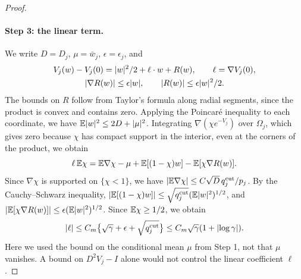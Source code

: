 \begin{proof}
\paragraph{Step 3: the linear term.}
We write $D=D_j$, $\mu=\bar w_j$, $\epsilon=\epsilon_j$, and
\[
 \begin{gathered}
 V_j(w)-V_j(0)=\lvert w\rvert^2/2+\ell\cdot w+R(w),\qquad\ell=\nabla V_j(0),\\
 \lvert \nabla R(w)\rvert\le\epsilon\lvert w\rvert,\qquad\lvert R(w)\rvert\le\epsilon\lvert w\rvert^2/2.
 \end{gathered}
\]
The bounds on $R$ follow from Taylor's formula along radial segments, since the product is convex and contains zero. Applying the Poincar\'e inequality to each coordinate, we have $\mathbb E\lvert w\rvert^2\le2D+\lvert \mu\rvert^2$. Integrating $\nabla(\chi e^{-V_j})$ over $\Omega_j$, which gives zero because $\chi$ has compact support in the interior, even at the corners of the product, we obtain
\begin{equation}\label{ch31:eq:density-interior-score}
 \ell\,\mathbb E\chi=\mathbb E\nabla\chi-\mu+\mathbb E[(1-\chi)w]-\mathbb E[\chi\nabla R(w)].
\end{equation}
Since $\nabla\chi$ is supported on $\{\chi<1\}$, we have $\lvert \mathbb E\nabla\chi\rvert\le C\sqrt D\,q_j^{\rm cut}/p_j$. By the Cauchy--Schwarz inequality, $\lvert \mathbb E[(1-\chi)w]\rvert\le\sqrt{q_j^{\rm cut}}(\mathbb E\lvert w\rvert^2)^{1/2}$, and $\lvert \mathbb E[\chi\nabla R(w)]\rvert\le\epsilon(\mathbb E\lvert w\rvert^2)^{1/2}$. Since $\mathbb E\chi\ge1/2$, we obtain
\[
 \lvert \ell\rvert\le C_m\bigl\{\sqrt\gamma+\epsilon+\sqrt{q_j^{\rm cut}}\bigr\}\le C_m\sqrt\gamma(1+\lvert \log\gamma\rvert).
\]
Here we used the bound on the conditional mean $\mu$ from Step 1, not that $\mu$ vanishes. A bound on $D^2V_j-I$ alone would not control the linear coefficient $\ell$.


\end{proof}
